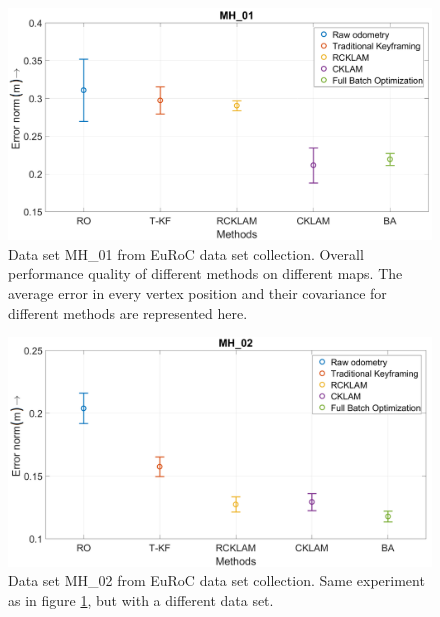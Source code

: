\begin{figure}
	\centering
		\includegraphics[width=1.00\textwidth]{images/MethodComparisonMH01.png}
  \caption{Data set MH\_01 from EuRoC \cite{Burri25012016} data set collection. Overall performance quality of different methods on different maps. The average error in every vertex position and their covariance for different methods are represented here.}
  \label{fig:MethodComparisonMH01}
\end{figure}

\begin{figure}
	\centering
		\includegraphics[width=1.00\textwidth]{images/MethodComparisonMH02.png}
  \caption{Data set MH\_02 from EuRoC \cite{Burri25012016} data set collection. Same experiment as in figure \ref{fig:MethodComparisonMH01}, but with a different data set.}
  \label{fig:MethodComparisonMH02}
\end{figure}

